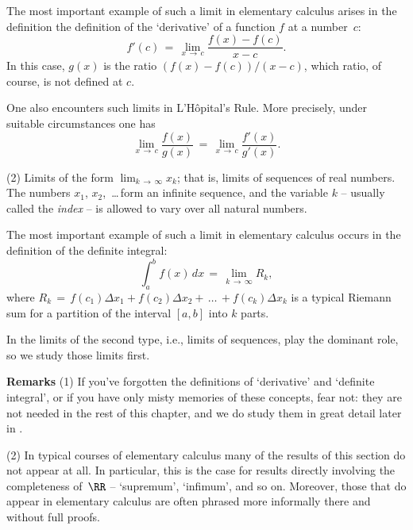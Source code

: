         The most important example of such a limit in elementary calculus arises in the definition the definition of the `derivative' of a function $f$ at a number~$c$:
        \begin{displaymath}
        f'(c) \,=\, \lim_{x \,{\rightarrow}\, c} \frac{f(x)-f(c)}{x-c}.
        \end{displaymath}
    In this case, $g(x)$ is the ratio $(f(x)-f(c))/(x-c)$, which ratio, of course, is not defined at $c$.

        One also encounters such limits in L'H\^{o}pital's Rule. More precisely, under suitable circumstances one has
        \begin{displaymath}
        \lim_{x \,{\rightarrow}\, c} {\displaystyle \frac{f(x)}{g(x)}  \,=\, \lim_{x \,{\rightarrow}\, c} \frac{f'(x)}{g'(x)}}.
        \end{displaymath}

\V

        (2) Limits of the form $\lim_{k \,{\rightarrow}\, {\infty}} x_{k}$; that is, limits of sequences of real numbers.
    The numbers $x_{1}$, $x_{2}$, \,{\ldots}\,form an infinite sequence, and the variable $k$ -- usually called the {\em index} -- is allowed to vary over all natural numbers.

        The most important example of such a limit in elementary calculus occurs in the definition of the definite integral:
        \begin{displaymath}
        \int_{a}^{b} f(x)\,dx \,=\, \lim_{k \,{\rightarrow}\, {\infty}} R_{k},
        \end{displaymath}
    where $R_{k} \,=\, f(c_{1}){\Delta}x_{1} + f(c_{2}){\Delta}x_{2} + \,{\ldots}\, + f(c_{k}){\Delta}x_{k}$ is a typical Riemann sum for a partition of the interval $[a,b]$ into $k$ parts.

        In {\ThisText} the limits of the second type, i.e., limits of sequences, play the dominant role, so we study those limits first.


\V

        {\bf Remarks} (1) If you've forgotten the definitions of `derivative' and `definite integral', or if you have only misty memories of these concepts, fear not:
    they are not needed in the rest of this chapter, and we do study them in great detail later in {\ThisText}.

\VA

        (2) In typical courses of elementary calculus many of the results of this section do not appear at all.
    In particular, this is the case for results directly involving the completeness of~${\RR}$ -- `supremum', `infimum', and so on.
    Moreover, those that do appear in elementary calculus are often phrased more informally there and without full proofs.



